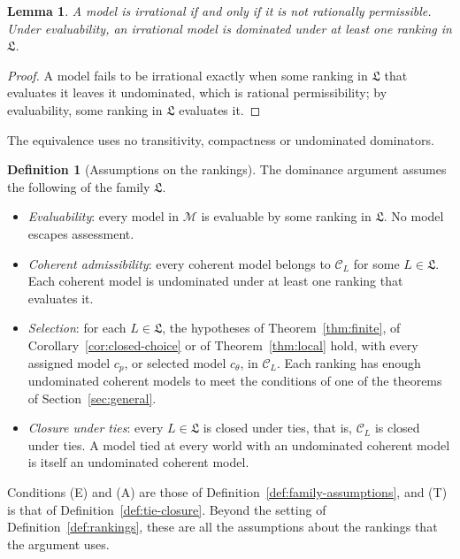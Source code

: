 \documentclass[11pt]{article}
\newtheorem{lemma}[theorem]{Lemma}
\theoremstyle{definition}
\newtheorem{definition}[theorem]{Definition}
\newcommand{\M}{\mathcal M}
\newcommand{\C}{\mathcal C}
\newcommand{\Lf}{\mathfrak L}
\begin{document}
\begin{lemma}\label{lem:complement}
A model is irrational if and only if it is not rationally permissible. Under evaluability, an irrational model is dominated under at least one ranking in $\Lf$.
\end{lemma}
\begin{proof}
A model fails to be irrational exactly when some ranking in $\Lf$ that evaluates it leaves it undominated, which is rational permissibility; by evaluability, some ranking in $\Lf$ evaluates it.
\end{proof}
The equivalence uses no transitivity, compactness or undominated dominators.

\begin{definition}[Assumptions on the rankings]\label{def:argument-assumptions}
The dominance argument assumes the following of the family $\Lf$.
\begin{itemize}[leftmargin=2.4em,labelsep=0.5em]
\item[\textbf{(E)}] \emph{Evaluability}: every model in $\M$ is evaluable by some ranking in $\Lf$. No model escapes assessment.
\item[\textbf{(A)}] \emph{Coherent admissibility}: every coherent model belongs to $\C_L$ for some $L\in\Lf$. Each coherent model is undominated under at least one ranking that evaluates it.
\item[\textbf{(S)}] \emph{Selection}: for each $L\in\Lf$, the hypotheses of Theorem~\ref{thm:finite}, of Corollary~\ref{cor:closed-choice} or of Theorem~\ref{thm:local} hold, with every assigned model $c_p$, or selected model $c_\theta$, in $\C_L$. Each ranking has enough undominated coherent models to meet the conditions of one of the theorems of Section~\ref{sec:general}.
\item[\textbf{(T)}] \emph{Closure under ties}: every $L\in\Lf$ is closed under ties, that is, $\C_L$ is closed under ties. A model tied at every world with an undominated coherent model is itself an undominated coherent model.
\end{itemize}
\end{definition}

Conditions (E) and (A) are those of Definition~\ref{def:family-assumptions}, and (T) is that of Definition~\ref{def:tie-closure}. Beyond the setting of Definition~\ref{def:rankings}, these are all the assumptions about the rankings that the argument uses.
\end{document}
